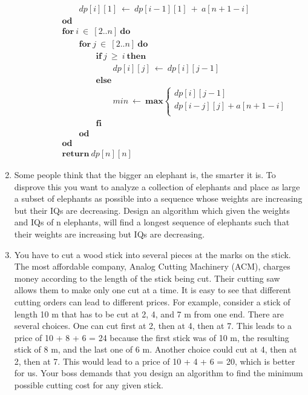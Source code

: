 \documentclass[a4paper]{article}
\newcommand{\qq}[0]{\qquad\qquad}
\newcommand{\qqq}[0]{\qquad\qquad\qquad}
\begin{document}
\begin{enumerate}
\begin{description}
\begin{align*}
												&\qquad\textit{dp}[i][1]\ \gets\ \textit{dp}[i-1][1]\ +\ a[n+1-i] \\
												&\textbf{od} \\
												&\textbf{for}\ i\ \in\ [2..n]\ \textbf{do} \\
												&\qquad\textbf{for}\ j\ \in\ [2..n]\ \textbf{do} \\
												&\qq \textbf{if}\ j\ \geq\ i\ \textbf{then} \\ 
												&\qqq \textit{dp}[i][j]\ \gets\ \textit{dp}[i][j-1] \\
												&\qq \textbf{else} \\
												&\qqq \textit{min}\ \gets\ \textbf{max}
												\begin{cases}
														\textit{dp}[i][j-1]  \\
														\textit{dp}[i-j][j] + a[n+1-i] \\
												\end{cases} \\
												&\qq \textbf{fi} \\
												&\qquad\textbf{od} \\
												&\textbf{od} \\
												&\textbf{return}\ \textit{dp}[n][n]
										\end{align*}
						\end{description}


				\item Some people think that the bigger an elephant is, the smarter it is. To disprove this you want to analyze a collection of elephants and place as large a subset of elephants as possible into a sequence whose weights are increasing but their IQs are decreasing. Design an algorithm which given the weights and IQs of n elephants, will find a longest sequence of elephants such that their weights are increasing but IQs are decreasing.

				\item You have to cut a wood stick into several pieces at the marks on the stick. The most affordable company, Analog Cutting Machinery (ACM), charges money according to the length of the stick being cut. Their cutting saw allows them to make only one cut at a time. It is easy to see that different cutting orders can lead to different prices. For example, consider a stick of length 10 m that has to be cut at 2, 4, and 7 m from one end. There are several choices. One can cut first at 2, then at 4, then at 7. This leads to a price of 10 + 8 + 6 = 24 because the first stick was of 10 m, the resulting stick of 8 m, and the last one of 6 m. Another choice could cut at 4, then at 2, then at 7. This would lead to a price of 10 + 4 + 6 = 20, which is better for us. Your boss demands that you design an algorithm to find the minimum possible cutting cost for any given stick.


\end{enumerate}
\end{document}
